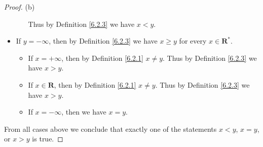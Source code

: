 \begin{proof}{(b)}
\begin{itemize}
\begin{itemize}
                        Thus by Definition \ref{6.2.3} we have \(x < y\).
              \end{itemize}
        \item If \(y = -\infty\), then by Definition \ref{6.2.3} we have \(x \geq y\) for every \(x \in \mathbf{R}^*\).
              \begin{itemize}
                  \item If \(x = +\infty\), then by Definition \ref{6.2.1} \(x \neq y\).
                        Thus by Definition \ref{6.2.3} we have \(x > y\).
                  \item If \(x \in \mathbf{R}\), then by Definition \ref{6.2.1} \(x \neq y\).
                        Thus by Definition \ref{6.2.3} we have \(x > y\).
                  \item If \(x = -\infty\), then we have \(x = y\).
              \end{itemize}
    \end{itemize}
    From all cases above we conclude that exactly one of the statements \(x < y\), \(x = y\), or \(x > y\) is true.
\end{proof}

